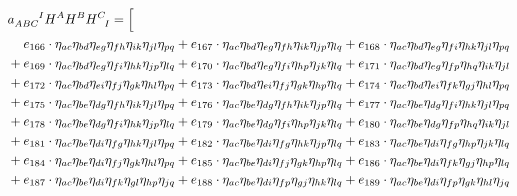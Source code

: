\begin{itemize}
{\begin{minipage}[t]{\linewidth}
\begin{align}
    & a_{ABC}^{\hphantom{ABC}I} H^A H^B H^C_{\hphantom CI} = \Big\lbrack \nonumber \\
    & \hphantom{{}+{}} e_{166} \cdot \eta_{a c} \eta_{b d} \eta_{e g} \eta_{f h} \eta_{i k} \eta_{j l} \eta_{p q} + e_{167} \cdot \eta_{a c} \eta_{b d} \eta_{e g} \eta_{f h} \eta_{i k} \eta_{j p} \eta_{l q} + e_{168} \cdot \eta_{a c} \eta_{b d} \eta_{e g} \eta_{f i} \eta_{h k} \eta_{j l} \eta_{p q} \nonumber \\
    & + e_{169} \cdot \eta_{a c} \eta_{b d} \eta_{e g} \eta_{f i} \eta_{h k} \eta_{j p} \eta_{l q} + e_{170} \cdot \eta_{a c} \eta_{b d} \eta_{e g} \eta_{f i} \eta_{h p} \eta_{j k} \eta_{l q} + e_{171} \cdot \eta_{a c} \eta_{b d} \eta_{e g} \eta_{f p} \eta_{h q} \eta_{i k} \eta_{j l} \nonumber \\
    & + e_{172} \cdot \eta_{a c} \eta_{b d} \eta_{e i} \eta_{f j} \eta_{g k} \eta_{h l} \eta_{p q} + e_{173} \cdot \eta_{a c} \eta_{b d} \eta_{e i} \eta_{f j} \eta_{g k} \eta_{h p} \eta_{l q} + e_{174} \cdot \eta_{a c} \eta_{b d} \eta_{e i} \eta_{f k} \eta_{g j} \eta_{h l} \eta_{p q} \nonumber \\
    & + e_{175} \cdot \eta_{a c} \eta_{b e} \eta_{d g} \eta_{f h} \eta_{i k} \eta_{j l} \eta_{p q} + e_{176} \cdot \eta_{a c} \eta_{b e} \eta_{d g} \eta_{f h} \eta_{i k} \eta_{j p} \eta_{l q} + e_{177} \cdot \eta_{a c} \eta_{b e} \eta_{d g} \eta_{f i} \eta_{h k} \eta_{j l} \eta_{p q} \nonumber \\
    & + e_{178} \cdot \eta_{a c} \eta_{b e} \eta_{d g} \eta_{f i} \eta_{h k} \eta_{j p} \eta_{l q} + e_{179} \cdot \eta_{a c} \eta_{b e} \eta_{d g} \eta_{f i} \eta_{h p} \eta_{j k} \eta_{l q} + e_{180} \cdot \eta_{a c} \eta_{b e} \eta_{d g} \eta_{f p} \eta_{h q} \eta_{i k} \eta_{j l} \nonumber \\
    & + e_{181} \cdot \eta_{a c} \eta_{b e} \eta_{d i} \eta_{f g} \eta_{h k} \eta_{j l} \eta_{p q} + e_{182} \cdot \eta_{a c} \eta_{b e} \eta_{d i} \eta_{f g} \eta_{h k} \eta_{j p} \eta_{l q} + e_{183} \cdot \eta_{a c} \eta_{b e} \eta_{d i} \eta_{f g} \eta_{h p} \eta_{j k} \eta_{l q} \nonumber \\
    & + e_{184} \cdot \eta_{a c} \eta_{b e} \eta_{d i} \eta_{f j} \eta_{g k} \eta_{h l} \eta_{p q} + e_{185} \cdot \eta_{a c} \eta_{b e} \eta_{d i} \eta_{f j} \eta_{g k} \eta_{h p} \eta_{l q} + e_{186} \cdot \eta_{a c} \eta_{b e} \eta_{d i} \eta_{f k} \eta_{g j} \eta_{h p} \eta_{l q} \nonumber \\
    & + e_{187} \cdot \eta_{a c} \eta_{b e} \eta_{d i} \eta_{f k} \eta_{g l} \eta_{h p} \eta_{j q} + e_{188} \cdot \eta_{a c} \eta_{b e} \eta_{d i} \eta_{f p} \eta_{g j} \eta_{h k} \eta_{l q} + e_{189} \cdot \eta_{a c} \eta_{b e} \eta_{d i} \eta_{f p} \eta_{g k} \eta_{h l} \eta_{j q} \nonumber \\

\end{align}
\end{minipage}}
\end{itemize}
